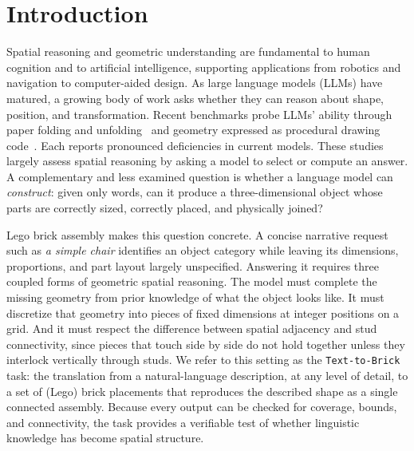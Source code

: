 



\section{Introduction}
Spatial reasoning and geometric understanding are fundamental to human cognition and to artificial intelligence, supporting applications from robotics and navigation to computer-aided design.
As large language models (LLMs) have matured, a growing body of work asks whether they can reason about shape, position, and transformation. Recent benchmarks probe LLMs' ability through 
paper folding and unfolding~\cite{zhou2026paperfolding} and geometry expressed as procedural drawing code~\cite{luo2026geogrambench}. Each reports pronounced deficiencies in current models. These studies largely assess spatial reasoning by asking a model to select or compute an answer. A complementary and less examined question is whether a language model can \emph{construct}: given only words, can it produce a three-dimensional object whose parts are correctly sized, correctly placed, and physically joined?

Lego brick assembly makes this question concrete. A concise narrative request such as \emph{a simple chair} identifies an object category while leaving its dimensions, proportions, and part layout largely unspecified. Answering it requires three coupled forms of geometric spatial reasoning. The model must complete the missing geometry from prior knowledge of what the object looks like. It must discretize that geometry into pieces of fixed dimensions at integer positions on a grid. And it must respect the difference between spatial adjacency and stud connectivity, since pieces that touch side by side do not hold together unless they interlock vertically through studs. We refer to this setting as the \texttt{Text-to-Brick} task: the translation from a natural-language description, at any level of detail, to a set of (Lego) brick placements that reproduces the described shape as a single connected assembly. Because every output can be checked for coverage, bounds, and connectivity, the task provides a verifiable test of whether linguistic knowledge has become spatial structure.

